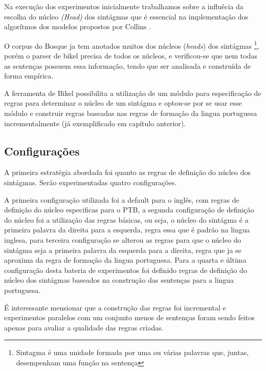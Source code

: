
Na execução dos experimentos inicialmente trabalhamos sobre a influêcia da escolha do núcleo \emph{(Head)} dos sintágmas que é essencial na implementação dos algorítmos dos modelos propostos por Collins \cite{collins99}.

O corpus do Bosque ja tem anotados muitos dos núcleos (\emph{heads}) dos sintágmas \footnote{Sintagma é uma unidade formada por uma ou várias palavras que, juntas, desempenham uma função na sentença}, porém o parser de bikel precisa de todos os núcleos, e verificou-se que nem todas as sentenças possuem essa informação, tendo que ser analisada e construída de forma empírica.

A ferramenta de Bikel possibilita a utilização de um módulo para especificação de regras para determinar o núcleo de um sintágma e optou-se por se usar esse módulo e construir regras baseadas nas regras de formação da lingua portuguesa incrementalmente (já exemplificado em capítulo anterior). 

\subsection{Configurações}
\label{sec:configuracoes}

A primeira estratégia abordada foi quanto as regras de definição do núcleo dos sintágmas. Serão experimentadas quatro configurações.

A primeira configuração utilizada foi a default para o inglês, com regras de definição do núcleo especificas para o PTB, a segunda configuração de definição do núcleo foi a utilização das regras básicas, ou seja, o núcleo do sintágma é a primeira palavra da direita para a esquerda, regra essa que é padrão na lingua inglesa, para terceira configuração se alterou as regras para que o núcleo do sintágma seja a primeira palavra da esquerda para a direita, regra que ja se aproxima da regra de formação da lingua portuguesa. Para a quarta e última configuração desta bateria de experimentos foi definido regras de definição do núcleo dos sintágmas baseados na construção das sentenças para a lingua portuguesa.

É interessante mensionar que a construção das regras foi incremental e experimentos paralelos com um conjunto menos de sentenças foram sendo feitos apenas para avaliar a qualidade das regras criadas.

